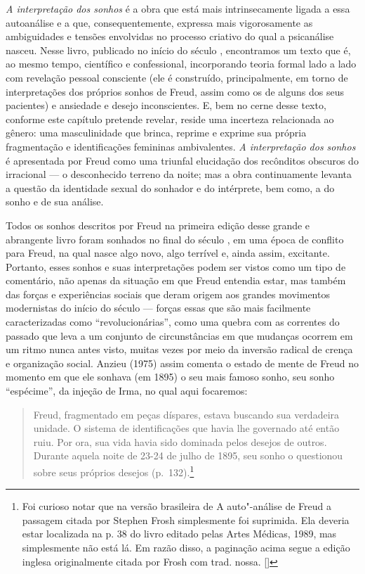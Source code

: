 \emph{A interpretação dos sonhos} é a obra que está mais intrinsecamente
ligada a essa autoanálise e a que, consequentemente, expressa mais
vigorosamente as ambiguidades e tensões envolvidas no processo criativo
do qual a psicanálise nasceu. Nesse livro, publicado no início do século
, encontramos um texto que é, ao mesmo tempo, científico e
confessional, incorporando teoria formal lado a lado com revelação
pessoal consciente (ele é construído, principalmente, em torno de
interpretações dos próprios sonhos de Freud, assim como os de alguns dos
seus pacientes) e ansiedade e desejo inconscientes. E, bem no cerne
desse texto, conforme este capítulo pretende revelar, reside uma
incerteza relacionada ao gênero: uma masculinidade que brinca, reprime e
exprime sua própria fragmentação e identificações femininas
ambivalentes. \emph{A interpretação dos sonhos} é apresentada por Freud
como uma triunfal elucidação dos recônditos obscuros do irracional --- o
desconhecido terreno da noite; mas a obra continuamente levanta a
questão da identidade sexual do sonhador e do intérprete, bem como, a do
sonho e de sua análise.

Todos os sonhos descritos por Freud na primeira edição desse grande e
abrangente livro foram sonhados no final do século , em uma época de
conflito para Freud, na qual nasce algo novo, algo terrível e, ainda
assim, excitante. Portanto, esses sonhos e suas interpretações podem ser
vistos como um tipo de comentário, não apenas da situação em que Freud
entendia estar, mas também das forças e experiências sociais que deram
origem aos grandes movimentos modernistas do início do século  ---
forças essas que são mais facilmente caracterizadas como
``revolucionárias'', como uma quebra com as correntes do passado que
leva a um conjunto de circunstâncias em que mudanças ocorrem em um ritmo
nunca antes visto, muitas vezes por meio da inversão radical de crença e
organização social. Anzieu (1975) assim comenta o estado de mente de
Freud no momento em que ele sonhava (em 1895) o seu mais famoso sonho,
seu sonho ``espécime'', da injeção de Irma, no qual aqui focaremos:

\begin{quote}
Freud, fragmentado em peças díspares, estava buscando sua verdadeira
unidade. O sistema de identificações que havia lhe governado até então
ruiu. Por ora, sua vida havia sido dominada pelos desejos de outros.
Durante aquela noite de 23-24 de julho de 1895, seu sonho o questionou
sobre seus próprios desejos (p.~132).\footnote{Foi curioso notar que na
  versão brasileira de A auto"-análise de Freud a passagem citada por
  Stephen Frosh simplesmente foi suprimida. Ela deveria estar localizada
  na p. 38 do livro editado pelas Artes Médicas, 1989, mas simplesmente
  não está lá. Em razão disso, a paginação acima segue a edição inglesa
  originalmente citada por Frosh com trad. nossa. []}
\end{quote}

